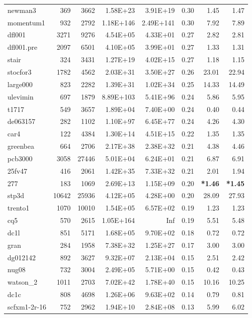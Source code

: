 \documentclass[10pt]{article}
\newcommand{\red}{
	\color{red}	
	}
\begin{document}
\begin{longtable}{|l|r|r|r|r|r|r|r|}
newman3	&	369	&	3662	&	1.58E+23	&	3.91E+19	&	0.30	&	1.45	&	1.47	\\
momentum1	&	932	&	2792	&	1.18E+146	&	2.49E+141	&	0.30	&	7.92	&	7.89	\\
dfl001	&	3271	&	9276	&	4.54E+05	&	4.33E+01	&	0.27	&	2.82	&	2.81	\\
dfl001.pre	&	2097	&	6501	&	4.10E+05	&	3.99E+01	&	0.27	&	1.33	&	1.31	\\
stair	&	324	&	3431	&	1.27E+19	&	4.02E+15	&	0.27	&	1.18	&	1.15	\\
stocfor3	&	1782	&	4562	&	2.03E+31	&	3.50E+27	&	0.26	&	23.01	&	22.94	\\
large000	&	823	&	2282	&	1.39E+31	&	1.02E+34	&	0.25	&	14.33	&	14.49	\\
ulevimin	&	697	&	1879	&	8.89E+103	&	5.41E+96	&	0.24	&	5.86	&	5.95	\\
t1717	&	549	&	3657	&	1.89E+04	&	7.40E+00	&	0.24	&	0.40	&	0.44	\\
de063157	&	282	&	1102	&	1.10E+97	&	6.45E+77	&	0.24	&	4.26	&	4.30	\\
car4	&	122	&	4384	&	1.30E+14	&	4.51E+15	&	0.22	&	1.35	&	1.35	\\
greenbea	&	664	&	2706	&	2.17E+38	&	2.38E+32	&	0.21	&	4.38	&	4.46	\\
pcb3000	&	3058	&	27446	&	5.01E+04	&	6.24E+01	&	0.21	&	6.87	&	6.91	\\
25fv47	&	416	&	2061	&	1.42E+35	&	7.33E+32	&	0.21	&	2.01	&	1.94	\\
277	&	183	&	1069	&	2.69E+13	&	1.15E+09	&	0.20	&	{\bf \red *1.46} 	&	{\bf \red *1.45}	\\
stp3d	&	10642	&	25936	&	4.12E+05	&	4.28E+00	&	0.20	&	28.09	&	27.93	\\
trento1	&	1070	&	10010	&	1.54E+05	&	6.57E+02	&	0.19	&	1.23	&	1.23	\\
cq5	&	570	&	2615	&	1.05E+164	&	Inf	&	0.19	&	5.51	&	5.48	\\
dc1l	&	851	&	5171	&	1.68E+05	&	9.70E+02	&	0.18	&	0.72	&	0.72	\\
gran	&	284	&	1958	&	7.38E+32	&	1.25E+27	&	0.17	&	3.00	&	3.00	\\
dg012142	&	892	&	3627	&	9.32E+07	&	2.13E+04	&	0.15	&	2.51	&	2.42	\\
nug08	&	732	&	3004	&	2.49E+05	&	5.71E+00	&	0.15	&	0.42	&	0.43	\\
watson\_2	&	1011	&	2703	&	7.02E+42	&	1.78E+40	&	0.15	&	10.16	&	10.25	\\
dc1c	&	808	&	4698	&	1.26E+06	&	9.63E+02	&	0.14	&	0.79	&	0.81	\\
scfxm1-2r-16	&	752	&	2962	&	1.94E+10	&	2.84E+08	&	0.13	&	5.99	&	6.02	\\

\end{longtable}
\end{document}
